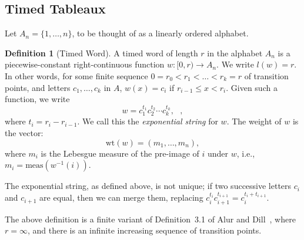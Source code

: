 \documentclass[10pt]{amsproc}
\theoremstyle{definition}
\newtheorem{definition}[theorem]{Definition}
\theoremstyle{remark}
\newcommand{\wt}{\mathrm{wt}}
\begin{document}
\subsection{Timed Tableaux}
\label{sec:timed-tableaux}
Let $A_n=\{1,\dotsc,n\}$, to be thought of as a linearly ordered alphabet.
\begin{definition}
  [Timed Word]
  \label{definition:timed-word}
  A timed word of length $r$ in the alphabet $A_n$ is a piecewise-constant right-continuous function $w:[0,r)\to A_n$.
  We write $l(w)=r$.
  In other words, for some finite sequence $0=r_0<r_1<\dotsc<r_k=r$ of transition points, and letters $c_1,\dotsc, c_k$ in $A$, $w(x) = c_i$ if $r_{i-1}\leq x < r_i$.
  Given such a function, we write
  \begin{equation}
    \label{eq:exp_not}
    w = c_1^{t_1} c_2^{t_2}\dotsb c_k^{t_k}, \text{ },
  \end{equation}
  where $t_i = r_i-r_{i-1}$.
  We call this the \emph{exponential string} for $w$.
  The weight of $w$ is the vector:
  \begin{displaymath}
    \wt(w) = (m_1,\dotsc,m_n),
  \end{displaymath}
  where $m_i$ is the Lebesgue measure of the pre-image of $i$ under $w$, i.e., $m_i=\mathrm{meas}(w^{-1}(i))$.
\end{definition}
The exponential string, as defined above, is not unique; if two successive letters $c_i$ and $c_{i+1}$ are equal, then we can merge them, replacing $c_i^{t_i}c_{i+1}^{t_{i+1}} = c_i^{t_i+t_{i+1}}$.

The above definition is a finite variant of Definition~3.1 of Alur and Dill~\cite{alur-dill}, where $r=\infty$, and there is an infinite increasing sequence of transition points.
\end{document}

